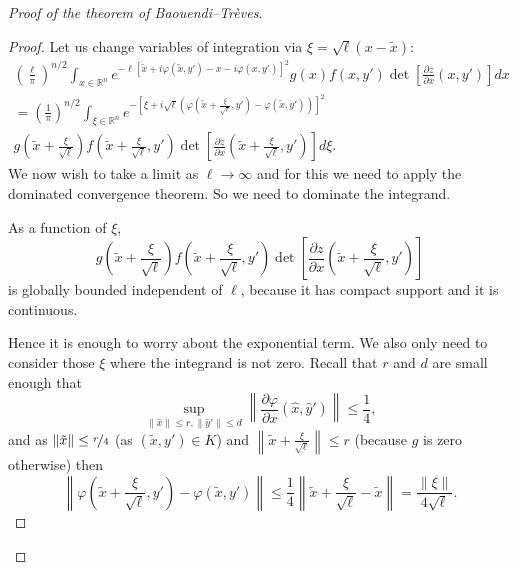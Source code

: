 \documentclass[12pt,openany]{book}
\newcommand{\snorm}[1]{\lVert {#1} \rVert}
\newcommand{\norm}[1]{\left\lVert {#1} \right\rVert}
\newcommand{\R}{{\mathbb{R}}}
\theoremstyle{plain}
\theoremstyle{remark}
\theoremstyle{definition}
\theoremstyle{exercise}
\theoremstyle{example}
\begin{document}
\begin{proof}[Proof of the theorem of Baouendi--Tr{\`e}ves]
\begin{proof}
Let us change variables of integration via $\xi = \sqrt{\ell} ( x-\tilde{x})$:
\begin{multline*}
{\left(\frac{\ell}{\pi}\right)}^{n/2}
\int_{x \in \R^n}
e^{  -\ell [\tilde{x}+i\varphi(\tilde{x},y') - x-i\varphi(x,y')]^2 } g(x) f(x,y')
\det \left[\frac{\partial z}{\partial x}(x,y')\right] dx
\\
=
{\left(\frac{1}{\pi}\right)}^{n/2}
\int_{\xi \in \R^n}
e^{-{\left[\xi +
i\sqrt{\ell}\left(\varphi\left(\tilde{x}+\frac{\xi}{\sqrt{\ell}},y'\right) -
\varphi(\tilde{x},y')\right)\right]}^2}
\\
g\left(\tilde{x}+\frac{\xi}{\sqrt{\ell}}\right)
f\left(\tilde{x}+\frac{\xi}{\sqrt{\ell}},y'\right)
\det \left[\frac{\partial z}{\partial
x}\left(\tilde{x}+\frac{\xi}{\sqrt{\ell}},y'\right)\right] d\xi .
\end{multline*}
We now wish to take a limit as $\ell \to \infty$ and for this we need to apply
the dominated convergence theorem.  So we need to dominate the integrand.

As a function of $\xi$,
\begin{equation*}
g\left(\tilde{x}+\frac{\xi}{\sqrt{\ell}}\right)
f\left(\tilde{x}+\frac{\xi}{\sqrt{\ell}},y'\right)
\det \left[\frac{\partial z}{\partial
x}\left(\tilde{x}+\frac{\xi}{\sqrt{\ell}},y'\right)\right]
\end{equation*}
is globally bounded independent of $\ell$, because it has compact support and it is continuous.

Hence it is enough to worry about the exponential term.
We also only need to consider those $\xi$ where the integrand is not zero.
Recall that $r$ and $d$ are small enough that
\begin{equation*}
\sup_{\snorm{\hat{x}} \leq r, \snorm{\hat{y}'} \leq d}
\norm{\frac{ \partial \varphi}{\partial  x}(\hat{x},\hat{y}')} \leq \frac{1}{4} ,
\end{equation*}
and as $\snorm{\tilde{x}} \leq \nicefrac{r}{4}$ (as
$(\tilde{x},y') \in K$) and
$\norm{\tilde{x}+\frac{\xi}{\sqrt{\ell}}} \leq r$ (because $g$ is
zero otherwise) then
\begin{equation*}
\norm{\varphi\left(\tilde{x}+\frac{\xi}{\sqrt{\ell}},y'\right) -
\varphi(\tilde{x},y')}
\leq \frac{1}{4} \norm{\tilde{x}+\frac{\xi}{\sqrt{\ell}}-\tilde{x}} =
\frac{\snorm{\xi}}{4 \sqrt{\ell}} .
\end{equation*}


\end{proof}
\end{proof}
\end{document}
